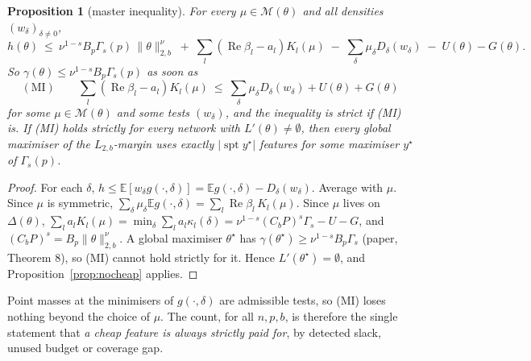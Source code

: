 \documentclass[11pt]{article}
\newtheorem{proposition}[theorem]{Proposition}
\theoremstyle{definition}
\renewcommand{\Re}{\operatorname{Re}}
\begin{document}
\begin{proposition}[master inequality]\label{prop:master}
For every $\mu\in\mathcal M(\theta)$ and all densities $(w_\delta)_{\delta\ne0}$,
\[h(\theta)\ \le\ \nu^{1-s}B_p\Gamma_s(p)\,\|\theta\|_{2,b}^{\nu}\;+\;\sum_l(\Re\beta_l-a_l)K_l(\mu)\;-\;\sum_\delta\mu_\delta D_\delta(w_\delta)\;-\;U(\theta)-G(\theta).\]
So $\gamma(\theta)\le\nu^{1-s}B_p\Gamma_s(p)$ as soon as
\[(\mathrm{MI})\qquad\sum_l(\Re\beta_l-a_l)K_l(\mu)\ \le\ \sum_\delta\mu_\delta D_\delta(w_\delta)+U(\theta)+G(\theta)\]
for some $\mu\in\mathcal M(\theta)$ and some tests $(w_\delta)$, and the inequality is strict if (MI) is.  If (MI) holds strictly for
every network with $L'(\theta)\ne\emptyset$, then every global maximiser of the $L_{2,b}$-margin uses exactly
$|\operatorname{spt}y^\star|$ features for some maximiser $y^\star$ of $\Gamma_s(p)$.
\end{proposition}
\begin{proof}
For each $\delta$, $h\le\mathbb E[w_\delta g(\cdot,\delta)]=\mathbb Eg(\cdot,\delta)-D_\delta(w_\delta)$.  Average with $\mu$.  Since $\mu$ is symmetric,
$\sum_\delta\mu_\delta\mathbb Eg(\cdot,\delta)=\sum_l\Re\beta_l\,K_l(\mu)$.  Since $\mu$ lives on $\Delta(\theta)$,
$\sum_la_lK_l(\mu)=\min_\delta\sum_la_l\kappa_l(\delta)=\nu^{1-s}(C_bP)^s\Gamma_s-U-G$, and $(C_bP)^s=B_p\|\theta\|^\nu_{2,b}$.
A global maximiser $\theta^\star$ has $\gamma(\theta^\star)\ge\nu^{1-s}B_p\Gamma_s$ (paper, Theorem 8), so (MI) cannot hold strictly for it.
Hence $L'(\theta^\star)=\emptyset$, and Proposition~\ref{prop:nocheap} applies.
\end{proof}
Point masses at the minimisers of $g(\cdot,\delta)$ are admissible tests, so (MI) loses nothing beyond the choice of $\mu$.  The
count, for all $n,p,b$, is therefore the single statement that \emph{a cheap feature is always strictly paid for}, by detected
slack, unused budget or coverage gap.
\end{document}
